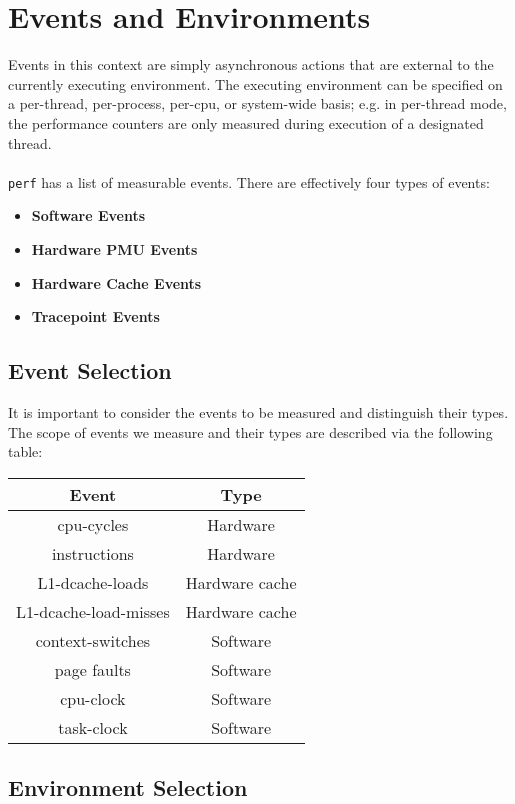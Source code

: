 \documentclass{article}
\begin{document}
\section{Events and Environments}
Events in this context are simply asynchronous actions that are external to the currently executing environment. The executing environment can be specified on a per-thread, per-process, per-cpu, or system-wide basis; e.g. in per-thread mode, the performance counters are only measured during execution of a designated thread. 
\\\\
\texttt{perf} has a list of measurable events. There are effectively four types of events:
\begin{itemize}
    \item \textbf{Software Events}
    \item \textbf{Hardware PMU Events}
    \item \textbf{Hardware Cache Events}
    \item \textbf{Tracepoint Events}
\end{itemize}
\subsection{Event Selection}
It is important to consider the events to be measured and distinguish their types. The scope of events we measure and their types are described via the following table:
\begin{center}
    \begin{tabular}{|c|c|}
        \hline
        \textbf{Event} & \textbf{Type}  \\
        \hline
         cpu-cycles & Hardware\\
         instructions & Hardware\\
         L1-dcache-loads & Hardware cache\\
         L1-dcache-load-misses & Hardware cache\\
         context-switches & Software\\
         page faults & Software\\
         cpu-clock & Software\\
         task-clock & Software\\
    \hline
    \end{tabular}
\end{center}
\pagebreak
\subsection{Environment Selection}
\end{document}
